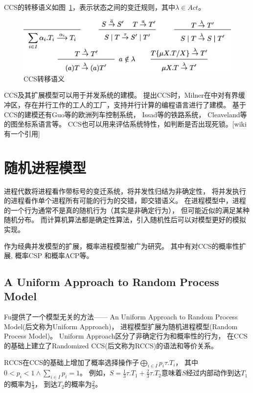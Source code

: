    CCS的转移语义如图~\ref{fig_ccs}，表示状态之间的变迁规则，其中$\lambda \in Act$。

   \begin{figure}[!htbp]
    \small
    \centering
    \includegraphics[width=13cm]{../figure/ccs.png}
    \caption[]{CCS转移语义}
     \label{fig_ccs}
 \end{figure}

   CCS及其扩展模型可以用于并发系统的建模。
   提出CCS时，Milner在\cite{2}中对有界缓冲区，存在并行工作的工人的工厂，支持并行计算的编程语言进行了建模。
   基于CCS的建模还有Guo等的欧洲列车控制系统\cite{16}，
   Issad等的铁路系统\cite{17}，
   Cleaveland等的图坐标系语言\cite{18}等。
   CCS也可以用来评估系统特性，如判断是否出现死锁。[wiki有一个引用]
   \section{随机进程模型}

   进程代数将进程看作带标号的变迁系统，将并发性归结为非确定性，
   将并发执行的进程看作单个进程所有可能的行为的交错，即交错语义。
   在进程模型中，进程的一个行为通常不是真的随机行为（其实是非确定行为），
   但可能近似的满足某种随机分布。
   而计算机算法都是确定性算法，引入随机性后可以对模型更好的模拟实现。

   作为经典并发模型的扩展，概率进程模型被广为研究。
   其中有对CCS的概率性扩展\cite{9,10},
   概率CSP\cite{11} 和概率ACP\cite{12}等。

   \subsection{A Uniform Approach to Random Process Model}
   Fu提供了一个模型无关的方法—— An Uniform Approach to Random Process Model(后文称为Uniform Approach)，
   进程模型扩展为随机进程模型(Random Process Model)。
   Uniform Approach区分了非确定行为和概率性的行为，
   在CCS的基础上建立了Randomized CCS(后文称为RCCS)的语法和等价关系。

   RCCS在CCS的基础上增加了概率选择操作子$\bigoplus_{i\in I}p_i\tau.T_i$，
   其中$0<p_i<1 \wedge \sum_{i\in I}p_i = 1$。
   例如，$S=\frac{1}{3}\tau.T_1+\frac{2}{3}\tau.T_2$意味着$S$经过内部动作到达$T_1$的概率为$\frac{1}{3}$，
   到达$T_2$的概率为$\frac{2}{3}$。


